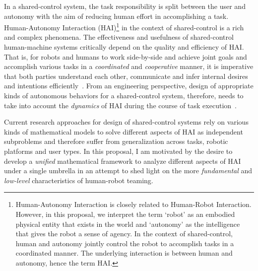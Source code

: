 \documentclass[12pt]{article}
\begin{document}
In a shared-control system, the task responsibility is split between the user and autonomy with the aim of reducing human effort in accomplishing a task. Human-Autonomy Interaction (HAI)\footnote{Human-Autonomy Interaction is closely related to Human-Robot Interaction. However, in this proposal, we interpret the term `robot' as an embodied physical entity that exists in the world and `autonomy' as the intelligence that gives the robot a sense of agency. In the context of shared-control, human and autonomy jointly control the robot to accomplish tasks in a coordinated manner. The underlying interaction is between human and autonomy, hence the term HAI.} in the context of shared-control is a rich and complex phenomena. The effectiveness and usefulness of shared-control human-machine systems critically depend on the quality and efficiency of HAI. That is, for robots and humans to work side-by-side and achieve joint goals and accomplish various tasks in a \textit{coordinated} and \textit{cooperative} manner, it is imperative that both parties understand each other, communicate and infer internal desires and intentions efficiently~\cite{hoc2001towards}. From an engineering perspective, design of appropriate kinds of autonomous behaviors for a shared-control system, therefore, needs to take into account the \textit{dynamics} of HAI during the course of task execution~\cite{hoffman2007cost}. 

Current research approaches for design of shared-control systems rely on various kinds of mathematical models to solve different aspects of HAI as independent subproblems and therefore suffer from generalization across tasks, robotic platforms and user types. In this proposal, I am motivated by the desire to develop a \textit{unified} mathematical framework to analyze different aspects of HAI under a single umbrella in an attempt to shed light on the more \textit{fundamental} and \textit{low-level} characteristics of human-robot teaming.
\end{document}

